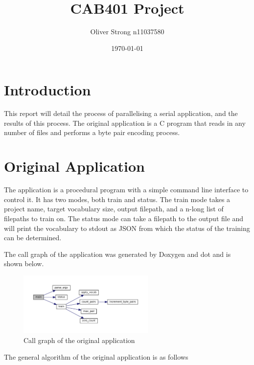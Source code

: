 \documentclass{article}
\title{CAB401 Project}
\author{Oliver Strong n11037580}
\date{\today}
\begin{document}
\maketitle
\tableofcontents
\section{Introduction}
This report will detail the process of parallelising a serial application, and the results of this process.
The original application is a C program that reads in any number of files and performs a byte pair encoding process.

\section{Original Application}
The application is a procedural program with a simple command line interface to control it. It has two modes, both train and status.
The train mode takes a project name, target vocabulary size, output filepath, and a n-long list of filepaths to train on. The status mode
can take a filepath to the output file and will print the vocabulary to stdout as JSON from which the 
status of the training can be determined.

The call graph of the application was generated by Doxygen and dot and is shown below.
\begin{figure}[H]
    \centering
    \includegraphics[width=0.6\textwidth]{original_application_callgraph.pdf}
    \caption{Call graph of the original application}
\end{figure}

The general algorithm of the original application is as follows
\end{document}
